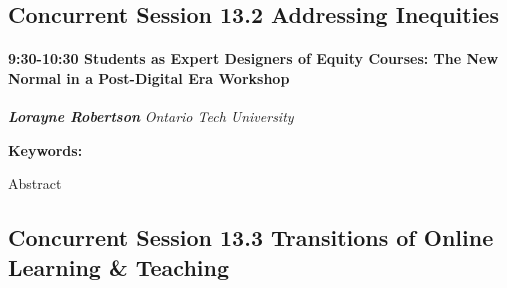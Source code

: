 \documentclass[
]{book}
\begin{document}
\hypertarget{concurrent-session-13.2-addressing-inequities}{%
\subsection*{Concurrent Session 13.2 \textbar{} Addressing Inequities}\label{concurrent-session-13.2-addressing-inequities}}

\begin{session}
\hypertarget{students-as-expert-designers-of-equity-courses-the-new-normal-in-a-post-digital-era-workshop}{%
\paragraph*{\texorpdfstring{9:30-10:30 \textbar{} \textbf{Students as
Expert Designers of Equity Courses: The New Normal in a Post-Digital
Era} \textbar{}
Workshop}{9:30-10:30 \textbar{} Students as Expert Designers of Equity Courses: The New Normal in a Post-Digital Era \textbar{} Workshop}}\label{students-as-expert-designers-of-equity-courses-the-new-normal-in-a-post-digital-era-workshop}}

\textbf{\emph{Lorayne Robertson}} \textbar{} \emph{Ontario Tech
University}

\textbf{Keywords:}

Abstract
\end{session}

\hypertarget{concurrent-session-13.3-transitions-of-online-learning-teaching}{%
\subsection*{Concurrent Session 13.3 \textbar{} Transitions of Online Learning \& Teaching}\label{concurrent-session-13.3-transitions-of-online-learning-teaching}}
\end{document}
